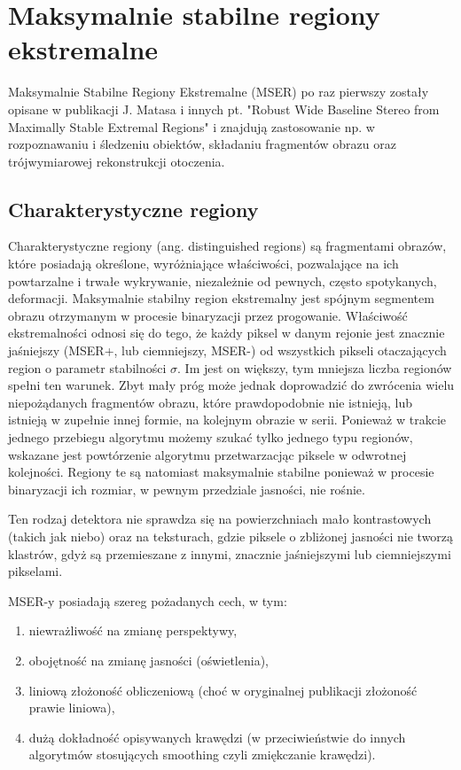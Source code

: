 \chapter{Maksymalnie stabilne regiony ekstremalne}

Maksymalnie Stabilne Regiony Ekstremalne (MSER) po raz pierwszy zostały opisane
w publikacji J. Matasa i innych pt. "Robust Wide Baseline Stereo from Maximally Stable
Extremal Regions" \cite{matas02} i znajdują zastosowanie np. w rozpoznawaniu i
śledzeniu obiektów, składaniu fragmentów obrazu oraz trójwymiarowej
rekonstrukcji otoczenia.

\section{Charakterystyczne regiony}

Charakterystyczne regiony (ang. distinguished regions) są fragmentami obrazów,
które posiadają określone, wyróżniające właściwości, pozwalające na ich
powtarzalne i trwałe wykrywanie, niezależnie od pewnych, często spotykanych,
deformacji. Maksymalnie stabilny region ekstremalny jest spójnym segmentem
obrazu otrzymanym w procesie binaryzacji przez progowanie. Właściwość
ekstremalności odnosi się do tego, że każdy piksel w danym rejonie jest
znacznie jaśniejszy (MSER+, lub ciemniejszy, MSER-) od wszystkich pikseli
otaczających region o parametr stabilności $\sigma$. Im jest on większy, tym
mniejsza liczba regionów spełni ten warunek. Zbyt mały próg może jednak
doprowadzić do zwrócenia wielu niepożądanych fragmentów obrazu, które
prawdopodobnie nie istnieją, lub istnieją w zupełnie innej formie, na kolejnym
obrazie w serii.  Ponieważ w trakcie jednego przebiegu algorytmu możemy szukać
tylko jednego typu regionów, wskazane jest powtórzenie algorytmu przetwarzacjąc
piksele w odwrotnej kolejności. Regiony te są natomiast maksymalnie stabilne
ponieważ w procesie binaryzacji ich rozmiar, w pewnym przedziale jasności, nie
rośnie.

Ten rodzaj detektora nie sprawdza się na powierzchniach mało kontrastowych
(takich jak niebo) oraz na teksturach, gdzie piksele o zbliżonej jasności nie
tworzą klastrów, gdyż są przemieszane z innymi, znacznie jaśniejszymi lub
ciemniejszymi pikselami.

MSER-y posiadają szereg pożadanych cech, w tym:

\begin{enumerate} \item niewrażliwość na zmianę perspektywy, \item obojętność
    na zmianę jasności (oświetlenia), \item liniową złożoność obliczeniową
    (choć w oryginalnej publikacji złożoność prawie liniowa), \item dużą
    dokładność opisywanych krawędzi (w przeciwieństwie do innych algorytmów
    stosujących smoothing czyli zmiękczanie krawędzi).  \end{enumerate}


